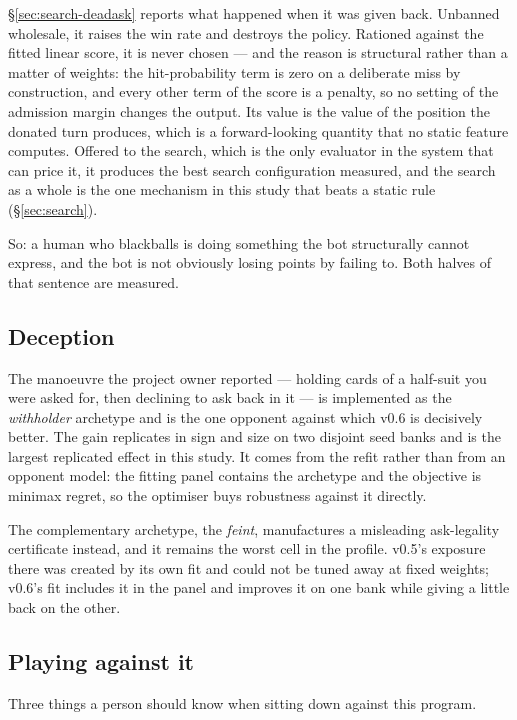 \S\ref{sec:search-deadask} reports what happened when it was given back. Unbanned wholesale, it
raises the win rate and destroys the policy. Rationed against the fitted linear score, it is never
chosen --- and the reason is structural rather than a matter of weights: the hit-probability term is
zero on a deliberate miss by construction, and every other term of the score is a penalty, so no
setting of the admission margin changes the output. Its value is the value of the position the
donated turn produces, which is a forward-looking quantity that no static feature computes. Offered
to the search, which is the only evaluator in the system that can price it, it produces the best
search configuration measured, and the search as a whole is the one mechanism in this study that
beats a static rule (\S\ref{sec:search}).

So: a human who blackballs is doing something the bot structurally cannot express, and the bot is
not obviously losing points by failing to. Both halves of that sentence are measured.

\subsection{Deception}
\label{app:human-bluff}

The manoeuvre the project owner reported --- holding cards of a half-suit you were asked for, then
declining to ask back in it --- is implemented as the \emph{withholder} archetype and is the one
opponent against which v0.6 is decisively better. The gain replicates in sign and size on two
disjoint seed banks and is the largest replicated effect in this study. It comes from the refit
rather than from an opponent model: the fitting panel contains the archetype and the objective is
minimax regret, so the optimiser buys robustness against it directly.

The complementary archetype, the \emph{feint}, manufactures a misleading ask-legality certificate
instead, and it remains the worst cell in the profile. v0.5's exposure there was created by its own
fit and could not be tuned away at fixed weights; v0.6's fit includes it in the panel and improves
it on one bank while giving a little back on the other.

\subsection{Playing against it}
\label{app:human-declare}

Three things a person should know when sitting down against this program.

